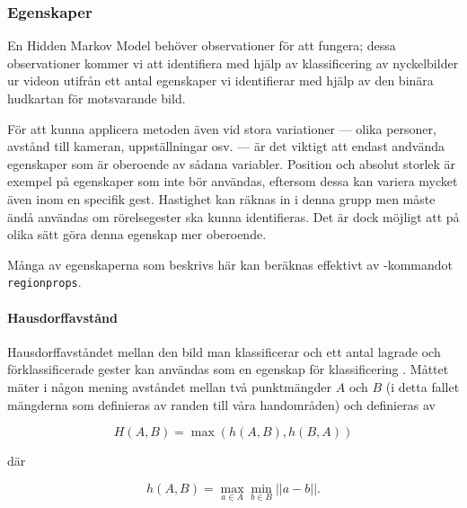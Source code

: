 \documentclass[../rapport_MVEX01-11-05]{subfiles}
\begin{document}
\subsubsection{Egenskaper}
En Hidden Markov Model behöver observationer för att fungera; dessa
observationer kommer vi att identifiera med hjälp av klassificering av
nyckelbilder ur videon utifrån ett antal egenskaper vi identifierar
med hjälp av den binära hudkartan för motsvarande bild.

För att kunna applicera metoden även vid stora variationer --- olika
personer, avstånd till kameran, uppställningar osv. --- är det viktigt
att endast andvända egenskaper som är oberoende av sådana variabler.
Position och absolut storlek är exempel på egenskaper som inte bör
användas, eftersom dessa kan variera mycket även inom en specifik
gest. Hastighet kan räknas in i denna grupp men måste ändå användas
om rörelsegester ska kunna identifieras. Det är dock möjligt att på
olika sätt göra denna egenskap mer oberoende.

Många av egenskaperna som beskrivs här kan beräknas effektivt av
\MATLAB-kommandot \texttt{regionprops}.




\paragraph{Hausdorffavstånd}

Hausdorffavståndet mellan den bild man klassificerar och ett antal
lagrade och förklassificerade gester kan användas som en egenskap för
klassificering \cite{Nielsen04}. Måttet mäter i någon mening avståndet
mellan två punktmängder $A$ och $B$ (i detta fallet mängderna som definieras av
randen till våra handområden) och definieras av

\begin{equation*}
  H(A, B) = \max\left(h(A,B),h(B, A)\right)
\end{equation*}

där

\begin{equation*}
  h(A, B) = \max\limits_{a\in A}\min\limits_{b\in
  B}\left|\left|a-b\right|\right|.
\end{equation*}
\end{document}
